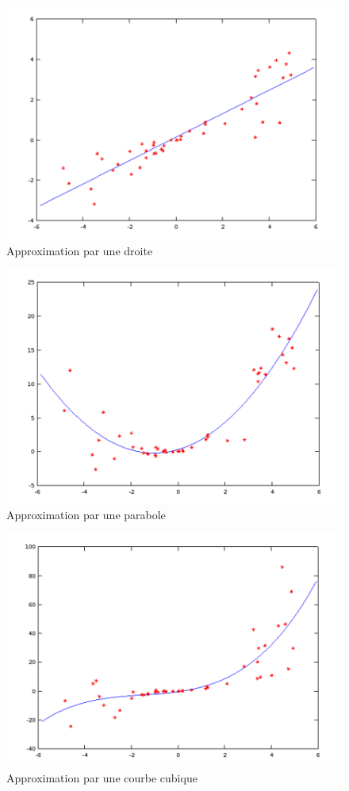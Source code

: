 \documentclass[a4paper,10pt]{article}
\begin{document}
\begin{figure}[h]
    \centering
    \includegraphics{./img/line.png}
    \caption{Approximation par une droite}
\end{figure}

\begin{figure}
    \centering
    \includegraphics{./img/parabola.png}
    \caption{Approximation par une parabole}
\end{figure}

\begin{figure}
    \centering
    \includegraphics{./img/spline.png}
    \caption{Approximation par une courbe cubique}
\end{figure}
\end{document}
